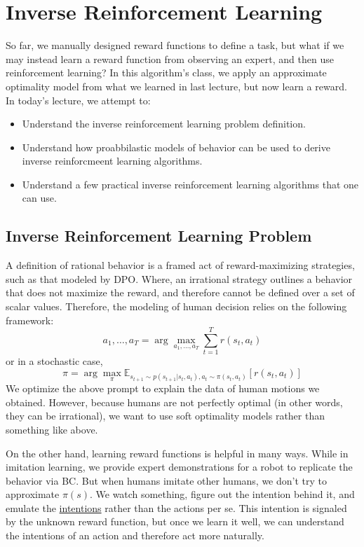 \chapter{Inverse Reinforcement Learning}
So far, we manually designed reward functions to define a task, but what if we may instead learn a reward function from observing an expert, and then use reinforcement learning?
In this algorithm's class, we apply an approximate optimality model from what we learned in last lecture, but now learn a reward.
In today's lecture, we attempt to:
\begin{itemize}
    \item Understand the inverse reinforcement learning problem definition.
    \item Understand how proabbilastic models of behavior can be used to derive inverse reinforcmeent learning algorithms.
    \item Understand a few practical inverse reinforcement learning algorithms that one can use.
\end{itemize}

\section{Inverse Reinforcement Learning Problem}
A definition of rational behavior is a framed act of reward-maximizing strategies, such as that modeled by DPO.
Where, an irrational strategy outlines a behavior that does not maximize the reward, and therefore cannot be defined over a set of scalar values.
Therefore, the modeling of human decision relies on the following framework:
\[
    a_1, \dots, a_T = \arg \max_{a_1, \dots, a_T} \sum_{t=1}^T r(s_t, a_t)
\]
or in a stochastic case,
\[
    \pi = \arg \max_\pi \mathbb{E}_{s_{t+1} \sim p(s_{t+1} | s_t, a_t), a_t \sim \pi(s_t, a_t)} [r(s_t, a_t)]
\]
We optimize the above prompt to explain the data of human motions we obtained.
However, because humans are not perfectly optimal (in other words, they can be irrational), we want to use soft optimality models rather than something like above.

On the other hand, learning reward functions is helpful in many ways.
While in imitation learning, we provide expert demonstrations for a robot to replicate the behavior via BC.
But when humans imitate other humans, we don't try to approximate $\pi(s)$.
We watch something, figure out the intention behind it, and emulate the \underline{intentions} rather than the actions per se.
This intention is signaled by the unknown reward function, but once we learn it well, we can understand the intentions of an action and therefore act more naturally.

